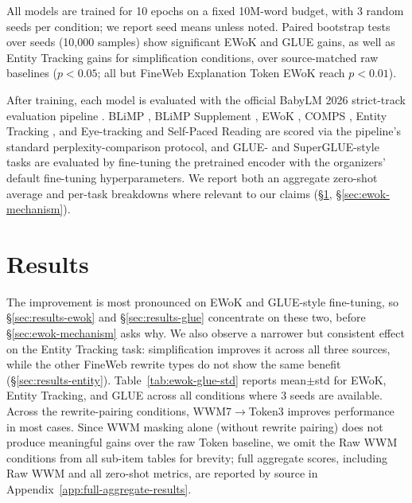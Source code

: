 \documentclass[11pt]{article}
\begin{document}
All models are trained for 10 epochs on a fixed 10M-word budget, with 3 random seeds per condition; we report seed means unless noted. Paired bootstrap tests over seeds (10{,}000 samples) show significant EWoK and GLUE gains, as well as Entity Tracking gains for simplification conditions, over source-matched raw baselines ($p<0.05$; all but FineWeb Explanation Token EWoK reach $p<0.01$).

After training, each model is evaluated with the official BabyLM 2026 strict-track evaluation pipeline \citep{babylm2026eval}. BLiMP \citep{warstadt2020blimp}, BLiMP Supplement \citep{warstadt2023findings}, EWoK \citep{ewok2024}, COMPS \citep{misra2023comps}, Entity Tracking \citep{kim2023entitytracking}, and Eye-tracking and Self-Paced Reading \citep{devarda2023clozeprobability} are scored via the pipeline's standard perplexity-comparison protocol, and GLUE- and SuperGLUE-style tasks \citep{wang2018glue,wang2019superglue} are evaluated by fine-tuning the pretrained encoder with the organizers' default fine-tuning hyperparameters. We report both an aggregate zero-shot average and per-task breakdowns where relevant to our claims (\S\ref{sec:results}, \S\ref{sec:ewok-mechanism}).

\section{Results}
\label{sec:results}
The improvement is most pronounced on EWoK and GLUE-style fine-tuning, so \S\ref{sec:results-ewok} and \S\ref{sec:results-glue} concentrate on these two, before \S\ref{sec:ewok-mechanism} asks why. We also observe a narrower but consistent effect on the Entity Tracking task: simplification improves it across all three sources, while the other FineWeb rewrite types do not show the same benefit (\S\ref{sec:results-entity}). Table~\ref{tab:ewok-glue-std} reports mean$\pm$std for EWoK, Entity Tracking, and GLUE across all conditions where 3 seeds are available. Across the rewrite-pairing conditions, WWM7$\to$Token3 improves performance in most cases. Since WWM masking alone (without rewrite pairing) does not produce meaningful gains over the raw Token baseline, we omit the Raw WWM conditions from all sub-item tables for brevity; full aggregate scores, including Raw WWM and all zero-shot metrics, are reported by source in Appendix~\ref{app:full-aggregate-results}.
\end{document}
